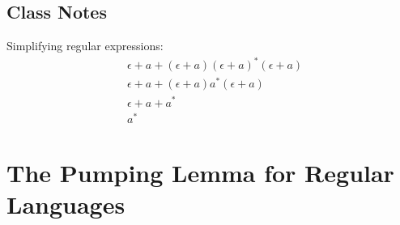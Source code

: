 \documentclass[]{article}
\begin{document}
  \subsection{Class Notes}
    Simplifying regular expressions:
    \begin{align*}
      & \epsilon + a + (\epsilon + a)(\epsilon + a)^*(\epsilon + a) \\
      & \epsilon + a + (\epsilon + a)a^*(\epsilon + a)              \\
      & \epsilon + a + a^*                                          \\
      & a^*
    \end{align*}

\section{The Pumping Lemma for Regular Languages}
\end{document}
